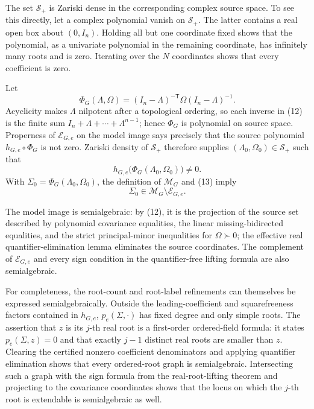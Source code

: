 The set \(\mathcal S_+\) is Zariski dense in the corresponding complex source space.  To see this directly, let a complex polynomial vanish on \(\mathcal S_+\).  The latter contains a real open box about \((0,I_n)\).  Holding all but one coordinate fixed shows that the polynomial, as a univariate polynomial in the remaining coordinate, has infinitely many roots and is zero.  Iterating over the \(N\) coordinates shows that every coefficient is zero.

Let
\[
 \Phi_G(\Lambda,\Omega)
 =(I_n-\Lambda)^{-\mathsf T}\Omega(I_n-\Lambda)^{-1}.          \tag{12}
\]
Acyclicity makes \(\Lambda\) nilpotent after a topological ordering, so each inverse in (12) is the finite sum \(I_n+\Lambda+\cdots+\Lambda^{n-1}\); hence \(\Phi_G\) is polynomial on source space.  Properness of \(\mathcal E_{G,e}\) on the model image says precisely that the source polynomial \(h_{G,e}\circ\Phi_G\) is not zero.  Zariski density of \(\mathcal S_+\) therefore supplies \((\Lambda_0,\Omega_0)\in\mathcal S_+\) such that
\[
 h_{G,e}\bigl(\Phi_G(\Lambda_0,\Omega_0)\bigr)\ne0.           \tag{13}
\]
With \(\Sigma_0=\Phi_G(\Lambda_0,\Omega_0)\), the definition of \(\mathcal M_G\) and (13) imply
\[
 \Sigma_0\in\mathcal M_G\setminus\mathcal E_{G,e}.           \tag{14}
\]

The model image is semialgebraic: by (12), it is the projection of the source set described by polynomial covariance equalities, the linear missing-bidirected equalities, and the strict principal-minor inequalities for \(\Omega\succ0\); the effective real quantifier-elimination lemma eliminates the source coordinates.  The complement of \(\mathcal E_{G,e}\) and every sign condition in the quantifier-free lifting formula are also semialgebraic.

For completeness, the root-count and root-label refinements can themselves be expressed semialgebraically.  Outside the leading-coefficient and squarefreeness factors contained in \(h_{G,e}\), \(p_e(\Sigma,\cdot)\) has fixed degree and only simple roots.  The assertion that \(z\) is its \(j\)-th real root is a first-order ordered-field formula: it states \(p_e(\Sigma,z)=0\) and that exactly \(j-1\) distinct real roots are smaller than \(z\).  Clearing the certified nonzero coefficient denominators and applying quantifier elimination shows that every ordered-root graph is semialgebraic.  Intersecting such a graph with the sign formula from the real-root-lifting theorem and projecting to the covariance coordinates shows that the locus on which the \(j\)-th root is extendable is semialgebraic as well.

